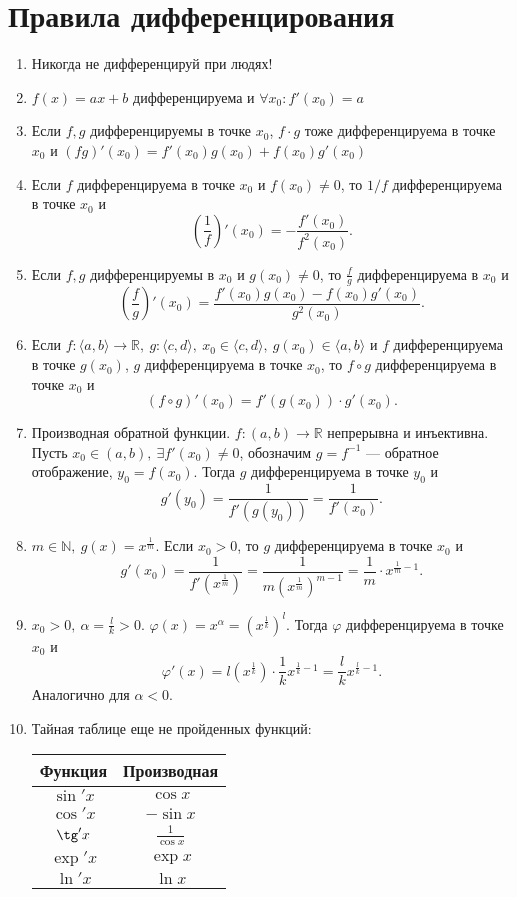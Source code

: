 \documentclass[11pt]{book}
\newcommand{\N}{\mathbb{N}}
\newcommand{\R}{\mathbb{R}}
\theoremstyle{definition}
\theoremstyle{plain}
\theoremstyle{plain}
\theoremstyle{definition}
\theoremstyle{remark}
\begin{document}
\section{Правила дифференцирования}
\begin{enumerate}[start=0]
    \item Никогда не дифференцируй при людях!
    \item $ f(x) = ax + b$ дифференцируема и $ \forall x_0: f'(x_0) = a$
    \item 
	Если $ f, g$ дифференцируемы в точке $ x_0$, $ f\cdot g$ тоже дифференцируема в точке  $ x_0$ и $ (fg)'(x_0) =f'(x_0)g(x_0) + f(x_0)g'(x_0)$
    \item Если $ f$ дифференцируема в точке $ x_0$ и $ f(x_0) \ne 0$, то $ 1 / f$ дифференцируема в точке $ x_0$ и
	\[
	    \left( \frac{1}{f} \right)' (x_0) = - \frac{f'(x_0)}{f^2(x_0)}
	.\] 
    \item Если $ f, g$ дифференцируемы в $ x_0$ и $ g(x_0) \ne 0$, то $ \frac{f}{g}$ дифференцируема в $ x_0$ и \[
	    \left( \frac{f}{g} \right) '(x_0) = \frac{f'(x_0) g(x_0)-f(x_0)g'(x_0)}{g^2(x_0)}
    .\] 
\item Если $ f: \langle a, b \rangle \to \R, ~ g: \langle c, d \rangle , ~ x_0 \in \langle c, d \rangle, ~ g(x_0) \in \langle a, b \rangle$ и $ f$ дифференцируема в точке  $ g(x_0)$, $ g$ дифференцируема в точке $ x_0$, то $ f \circ g$ дифференцируема в точке $ x_0$ и
    \[
	(f \circ g)'(x_0) = f'(g(x_0)) \cdot g'(x_0)
    .\] 
\item Производная обратной функции. $ f: (a, b) \to  \R$ непрерывна и инъективна. Пусть $ x_0 \in (a, b), ~ \exists f'(x_0) \ne 0$, обозначим $ g = f^{-1}$ --- обратное отображение, $ y_0 = f(x_0)$.
    Тогда $ g$ дифференцируема в точке $ y_0$ и 
    \[
	g'(y_0) = \frac{1}{f'(g(y_0))} = \frac{1}{f'(x_0)}  
    .\] 
\item $ m \in \N, ~ g(x) = x ^{\frac{1}{m}}$. Если $ x_0 >0$, то $ g$ дифференцируема в точке $ x_0$ и
    \[
	g'(x_0) = \frac{1}{f'\left(x ^{\frac{1}{m}}\right)} = \frac{1}{m \left( x ^{\frac{1}{m}} \right) ^{m-1}} = \frac{1}{m}\cdot x^{\frac{1}{m}-1}
    .\] 
\item $ x_0>0, ~ \alpha = \frac{l}{k} >0$. $ \varphi (x) = x^{\alpha} = \left( x^{\frac{1}{k}} \right)^{l}$.
    Тогда $ \varphi $ дифференцируема в точке $ x_0$ и \[
	\varphi '(x) = l\left(x^{\frac{1}{k}}\right) \cdot \frac{1}{k} x ^{\frac{1}{k}-1}  =  \frac{l}{k} x^{\frac{l}{k}-1}
    .\] 
    Аналогично для $ \alpha <0$.
\item Тайная таблице еще не пройденных функций:

\renewcommand{\arraystretch}{1.5}
    \begin{tabular}[ht]{c|c}
	Функция & Производная \\
	\hline
	$ \sin'x $ & $ \cos x$\\
	\hline
	$ \cos'x $ & $ -\sin x$\\
	\hline
	$ \tg'x $ & $ \frac{1}{\cos x} $\\
	\hline
	$ \exp'x $ & $ \exp x$\\
	\hline
	$ \ln'x $ & $ \ln x$\\
    \end{tabular}
\end{enumerate}
\end{document}
